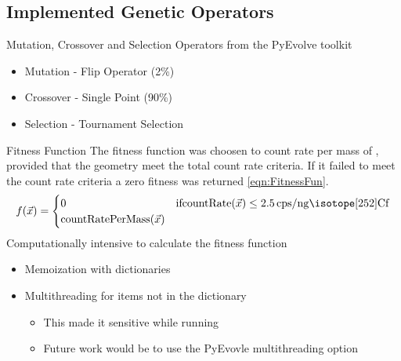\subsection{Implemented Genetic Operators}
\begin{frame}[fragile]{Mutation, Crossover and Selection}
  Operators from the PyEvolve toolkit
  \begin{itemize}
    \item Mutation - Flip Operator (2\%)
    \item Crossover - Single Point (90\%)
    \item Selection - Tournament Selection
  \end{itemize}
\end{frame}
\begin{frame}{Fitness Function}
The fitness function was choosen to count rate per mass of , provided that the geometry meet the total count rate criteria.
If it failed to meet the count rate criteria a zero fitness was returned \eqref{eqn:FitnessFun}.
\begin{align}
    \label{eqn:FitnessFun}
    f(\vec{x})
    = \begin{cases}
    0 & \text{if} \text{countRate}(\vec{x}) \leq \SI{2.5}{cps\per\nano\gram\iso[252]{Cf}} \\
    \text{countRatePerMass}(\vec{x})
    \end{cases}
\end{align}
Computationally intensive to calculate the fitness function 
\begin{itemize}
  \item Memoization with dictionaries
  \item Multithreading for items not in the dictionary
  \begin{itemize}
    \item This made it sensitive while running
    \item Future work would be to use the PyEvovle multithreading option
  \end{itemize}
\end{itemize}
\end{frame}
